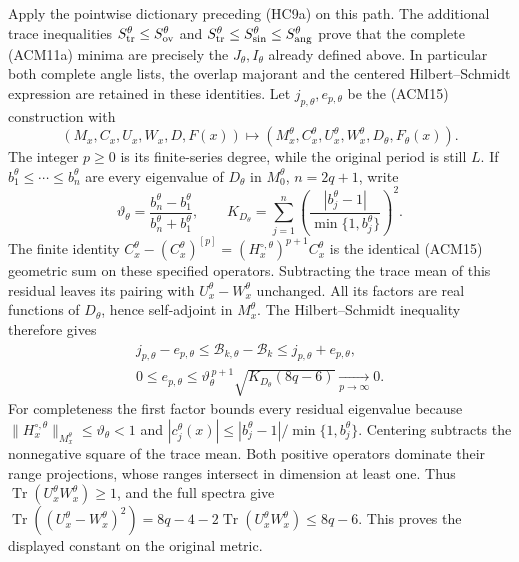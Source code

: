 Apply the pointwise dictionary preceding (HC9a) on this path.
The additional trace inequalities
$S_{\rm tr}^\theta\le S_{\rm ov}^\theta$ and
$S_{\rm tr}^\theta\le S_{\rm sin}^\theta\le S_{\rm ang}^\theta$
prove that the complete (ACM11a) minima are precisely the
$J_\theta,I_\theta$ already defined above. In particular both
complete angle lists, the overlap majorant and the centered
Hilbert--Schmidt expression are retained in these identities.
Let $j_{p,\theta},e_{p,\theta}$ be the (ACM15) construction with
\[
 (M_x,C_x,U_x,W_x,D,F(x))
 \longmapsto
 (M_x^\theta,C_x^\theta,U_x^\theta,W_x^\theta,D_\theta,F_\theta(x)).
\]
The integer $p\ge0$ is its finite-series degree, while the
original period is still $L$. If
$b_1^\theta\le\cdots\le b_n^\theta$ are every eigenvalue of
$D_\theta$ in $M_0^\theta$, $n=2q+1$, write
\[
 \vartheta_\theta=\frac{b_n^\theta-b_1^\theta}{b_n^\theta+b_1^\theta},
 \qquad
 K_{D_\theta}=\sum_{j=1}^n
       \left(\frac{|b_j^\theta-1|}{\min\{1,b_j^\theta\}}\right)^2 .
\]
The finite identity
$C_x^\theta-(C_x^\theta)^{[p]}
 =(H_x^{\circ,\theta})^{p+1}C_x^\theta$
is the identical (ACM15) geometric sum on these specified
operators. Subtracting the trace mean of this residual leaves
its pairing with $U_x^\theta-W_x^\theta$ unchanged.
All its factors are real functions of $D_\theta$, hence
self-adjoint in $M_x^\theta$. The Hilbert--Schmidt inequality
therefore gives
\[
\begin{gathered}
 j_{p,\theta}-e_{p,\theta}
 \le\mathcal B_{k,\theta}-\mathcal B_k
 \le j_{p,\theta}+e_{p,\theta},\\
 0\le e_{p,\theta}\le
 \vartheta_\theta^{\,p+1}\sqrt{K_{D_\theta}(8q-6)}
 \xrightarrow[p\to\infty]{}0 .
\end{gathered}\tag{HC14d}
\]
For completeness the first factor bounds every residual
eigenvalue because
$\|H_x^{\circ,\theta}\|_{M_x^\theta}\le\vartheta_\theta<1$ and
$|c_j^\theta(x)|\le|b_j^\theta-1|/\min\{1,b_j^\theta\}$.
Centering subtracts the nonnegative square of the trace mean.
Both positive operators dominate their range projections, whose
ranges intersect in dimension at least one. Thus
$\operatorname{Tr}(U_x^\theta W_x^\theta)\ge1$, and the full
spectra give
$\operatorname{Tr}((U_x^\theta-W_x^\theta)^2)
 =8q-4-2\operatorname{Tr}(U_x^\theta W_x^\theta)\le8q-6$.
This proves the displayed constant on the original metric.

